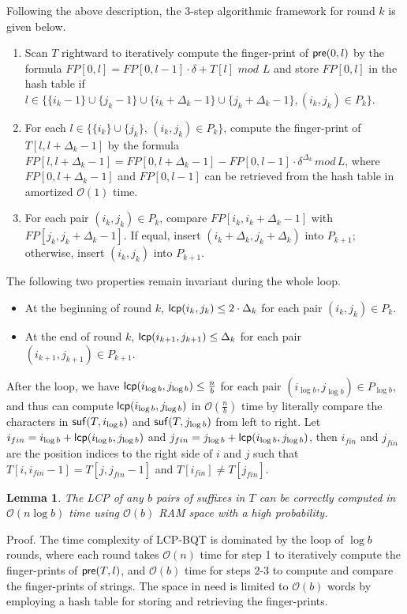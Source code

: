 \documentclass[article]{IEEEtran}
\newtheorem{lem}[thm]{Lemma}
\theoremstyle{definition}
\theoremstyle{remark}
\numberwithin{equation}{section}
\begin{document}
Following the above description, the 3-step algorithmic framework for round $k$ is given below.

\begin{enumerate}
\item Scan $T$ rightward to iteratively compute the finger-print of ${\sf pre}(0,l)$ by the formula $FP[0,l] = FP[0,l-1] \cdot \delta + T[l] \,\, mod \,\, L$ and store $FP[0,l]$ in the hash table if $l\in \{ \{i_k-1\}\cup\{j_k-1\}\cup\{i_k +\Delta_{k} - 1\}\cup\{j_k+ \Delta_{k} - 1\},(i_k,j_k)\in P_k\}$.
\item For each $l\in \{\{i_k\}\cup \{j_k\}$, $(i_k,j_k)\in P_k\}$, compute the finger-print of $T[l,l+\Delta_{k} - 1]$ by the formula $FP[l,l+ \Delta_{k} - 1]=FP[0,l+ \Delta_{k} - 1] - FP[0,l-1] \cdot \delta^{\Delta_{k}} \, mod \, L$, where $FP[0,l+ \Delta_{k} - 1]$ and $FP[0,l-1]$ can be retrieved from the hash table in amortized $\mathcal{O}(1)$ time.
\item For each pair $(i_k,j_k)\in P_k$, compare $FP[i_k,i_k+\Delta_{k} - 1]$ with $FP[j_k,j_k+\Delta_{k} - 1]$. If equal, insert $(i_k+\Delta_{k},j_k+\Delta_{k})$ into $P_{k+1}$; otherwise, insert $(i_k, j_k)$ into $P_{k+1}$.
\end{enumerate}

The following two properties remain invariant during the whole loop.

\begin{itemize}
\item At the beginning of round $k$, ${\sf lcp}(i_k,j_k) \le 2 \cdot \Delta_{k}$ for each pair $(i_k,j_k) \in P_k$.
\item At the end of round $k$, ${\sf lcp}(i_{k+1},j_{k+1}) \le \Delta_{k}$ for each pair $(i_{k+1},j_{k+1}) \in P_{k+1}$.
\end{itemize}

After the loop, we have ${\sf lcp}(i_{\log b},j_{\log b}) \le \frac{n}{b}$ for each pair $(i_{\log b},j_{\log b}) \in P_{\log b}$, and thus can compute ${\sf lcp}(i_{\log b}, j_{\log b})$ in $\mathcal{O}(\frac{n}{b})$ time by literally compare the characters in ${\sf suf}(T,i_{\log b})$ and ${\sf suf}(T,j_{\log b})$ from left to right. Let $i_{fin} = i_{\log b} + {\sf lcp}(i_{\log b}, j_{\log b})$ and $j_{fin}= j_{\log b} + {\sf lcp}(i_{\log b}, j_{\log b})$, then $i_{fin}$ and $j_{fin}$ are the position indices to the right side of $i$ and $j$ such that $T[i,i_{fin}-1] = T[j,j_{fin}-1]$ and $T[i_{fin}] \neq T[j_{fin}]$.

\begin{lem}
\label{thm:lcp:naive}
The LCP of any $b$ pairs of suffixes in $T$ can be correctly computed in $\mathcal{O}(n\log b)$ time using $\mathcal{O}(b)$ RAM space with a high probability.
\end{lem}
Proof. The time complexity of LCP-BQT is dominated by the loop of $\log b$ rounds, where each round takes $\mathcal{O}(n)$ time for step 1 to iteratively compute the finger-prints of ${\sf pre}(T,l)$, and $\mathcal{O}(b)$ time for steps 2-3 to compute and compare the finger-prints of strings. The space in need is limited to $\mathcal{O}(b)$ words by employing a hash table for storing and retrieving the finger-prints.
\end{document}
